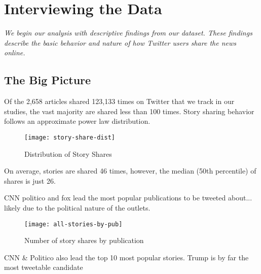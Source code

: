  \chapter{Interviewing the Data}
\emph{We begin our analysis with descriptive findings from our dataset.
These findings describe the basic behavior and nature of how Twitter users share the news online.}

\section{The Big Picture}
 

Of the 2,658 articles shared 123,133 times on Twitter that we track in our studies, the vast majority are shared less than 100 times. Story sharing behavior follows an approximate power law distribution.  

\begin{figure}[H]  
\centering 
  \texttt{[image: story-share-dist]}  
  \caption{Distribution of Story Shares
    \label{fig:story-share-dist}}
\end{figure} 

On average, stories are shared 46 times, however, the median (50th percentile) of shares is just 26. 

CNN politico and fox lead the most popular publications to be tweeted about... likely due to the political nature of the outlets.

\begin{figure}[H]  
\centering 
  \texttt{[image: all-stories-by-pub]}  
  \caption{Number of story shares by publication
    \label{fig:tweets-by-pub}}
\end{figure} 
 


\newpage

CNN & Politico also lead the top 10 most popular stories.
Trump is by far the most tweetable candidate
 
